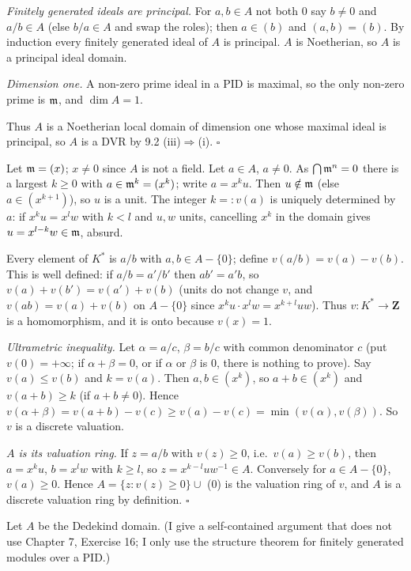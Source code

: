 \documentclass[11pt]{article}
\begin{document}
\emph{Finitely generated ideals are principal.} For $a,b\in A$ not both $0$ say $b\ne0$ and $a/b\in A$ (else $b/a\in A$ and swap the roles); then $a\in(b)$ and $(a,b)=(b)$. By induction every finitely generated ideal of $A$ is principal. $A$ is Noetherian, so $A$ is a principal ideal domain.

\emph{Dimension one.} A non-zero prime ideal in a PID is maximal, so the only non-zero prime is $\mathfrak m$, and $\dim A=1$.

Thus $A$ is a Noetherian local domain of dimension one whose maximal ideal is principal, so $A$ is a DVR by 9.2 (iii)$\Rightarrow$(i). \hfill$\square$

\pf
Let $\mathfrak m=(x)$; $x\ne0$ since $A$ is not a field. Let $a\in A$, $a\ne0$. As $\bigcap\mathfrak m^n=0$ there is a largest $k\ge0$ with $a\in\mathfrak m^k=(x^k)$; write $a=x^ku$. Then $u\notin\mathfrak m$ (else $a\in(x^{k+1})$), so $u$ is a unit. The integer $k=:v(a)$ is uniquely determined by $a$: if $x^ku=x^lw$ with $k<l$ and $u,w$ units, cancelling $x^k$ in the domain gives $u=x^{l-k}w\in\mathfrak m$, absurd.

Every element of $K^*$ is $a/b$ with $a,b\in A-\{0\}$; define $v(a/b)=v(a)-v(b)$. This is well defined: if $a/b=a'/b'$ then $ab'=a'b$, so $v(a)+v(b')=v(a')+v(b)$ (units do not change $v$, and $v(ab)=v(a)+v(b)$ on $A-\{0\}$ since $x^ku\cdot x^lw=x^{k+l}uw$). Thus $v:K^*\to\mathbf Z$ is a homomorphism, and it is onto because $v(x)=1$.

\emph{Ultrametric inequality.} Let $\alpha=a/c$, $\beta=b/c$ with common denominator $c$ (put $v(0)=+\infty$; if $\alpha+\beta=0$, or if $\alpha$ or $\beta$ is $0$, there is nothing to prove). Say $v(a)\le v(b)$ and $k=v(a)$. Then $a,b\in(x^k)$, so $a+b\in(x^k)$ and $v(a+b)\ge k$ (if $a+b\ne0$). Hence $v(\alpha+\beta)=v(a+b)-v(c)\ge v(a)-v(c)=\min(v(\alpha),v(\beta))$. So $v$ is a discrete valuation.

\emph{$A$ is its valuation ring.} If $z=a/b$ with $v(z)\ge0$, i.e.\ $v(a)\ge v(b)$, then $a=x^ku$, $b=x^lw$ with $k\ge l$, so $z=x^{k-l}uw^{-1}\in A$. Conversely for $a\in A-\{0\}$, $v(a)\ge0$. Hence $A=\{z:v(z)\ge0\}\cup$ ($0$) is the valuation ring of $v$, and $A$ is a discrete valuation ring by definition. \hfill$\square$

\pf
Let $A$ be the Dedekind domain. (I give a self-contained argument that does not use Chapter 7, Exercise 16; I only use the structure theorem for finitely generated modules over a PID.)
\end{document}
